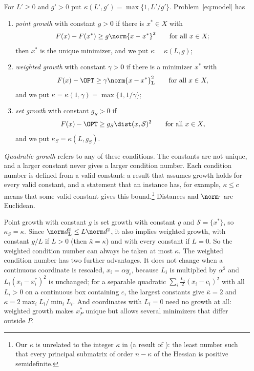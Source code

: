 \begin{definition}\label{def:growth}
For $L'\ge0$ and $g'>0$ put $\kappa(L',g')=\max\{1,L'/g'\}$.
Problem~\eqref{eq:model} has
\begin{enumerate}[label=(\alph*)]
\item \emph{point growth} with constant $g>0$ if there is $x^*\in X$ with
\begin{equation}\label{eq:growth}
F(x)-F(x^*)\ge g\norm{x-x^*}^2\qquad\text{for all }x\in X ;
\end{equation}
then $x^*$ is the unique minimizer, and we put $\kappa=\kappa(L,g)$;
\item \emph{weighted growth} with constant $\gamma>0$ if there is a minimizer
$x^*$ with
\begin{equation}\label{eq:wgrowth}
F(x)-\OPT\ge\gamma\norm{x-x^*}_{\mathbf L}^2\qquad\text{for all }x\in X ,
\end{equation}
and we put $\bar\kappa=\kappa(1,\gamma)=\max\{1,1/\gamma\}$;
\item \emph{set growth} with constant $g_S>0$ if
\begin{equation}\label{eq:setgrowth}
F(x)-\OPT\ge g_S\dist(x,\mathcal S)^2\qquad\text{for all }x\in X ,
\end{equation}
and we put $\kappa_S=\kappa(L,g_S)$.
\end{enumerate}
\end{definition}

\emph{Quadratic growth} refers to any of these conditions. The constants are
not unique, and a larger constant never gives a larger condition number. Each
condition number is defined from a valid constant: a result that assumes
growth holds for every valid constant, and a statement that an instance has,
for example, $\kappa\le c$ means that some valid constant gives this
bound.\footnote{Our $\kappa$ is unrelated to the integer $\kappa$ in
\cite[Lemma~20]{DelPiaKhajavirad2026} (a result of
\cite{Khajavirad2026PolyBox}): the least number such that every principal
submatrix of order $n-\kappa$ of the Hessian is positive semidefinite.}
Distances and $\norm\cdot$ are Euclidean.

Point growth with constant $g$ is set growth with constant $g$ and
$\mathcal S=\{x^*\}$, so $\kappa_S=\kappa$. Since $\norm d_{\mathbf L}^2\le
L\norm d^2$, it also implies weighted growth, with constant $g/L$ if $L>0$
(then $\bar\kappa=\kappa$) and with every constant if $L=0$. So the
weighted condition number can always be taken at most $\kappa$. The weighted
condition number has two further advantages. It does not change when a
continuous coordinate is rescaled,
$x_i=\alpha y_i$, because $L_i$ is multiplied by $\alpha^2$ and
$L_i(x_i-x_i^*)^2$ is unchanged; for a separable quadratic
$\sum_i\frac{L_i}{2}(x_i-c_i)^2$ with all $L_i>0$ on a continuous box
containing $c$, the largest constants give $\bar\kappa=2$ and
$\kappa=2\max_iL_i/\min_iL_i$. And coordinates with $L_i=0$ need no growth at
all: weighted growth makes $x^*_P$ unique but allows several minimizers that
differ outside $P$.

